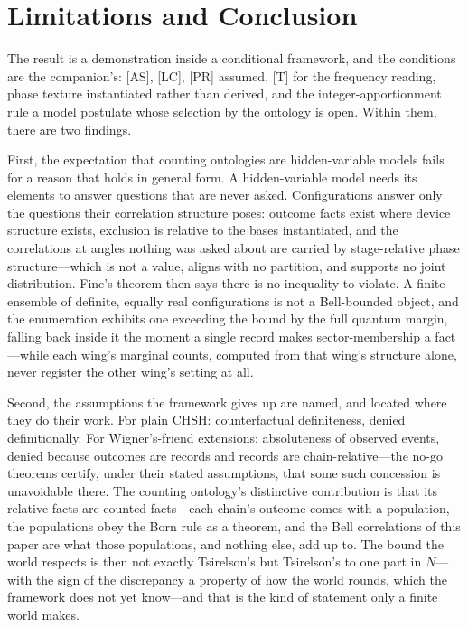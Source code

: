 \documentclass[11pt]{article}
\theoremstyle{definition}
\theoremstyle{remark}
\begin{document}
\section{Limitations and Conclusion}\label{sec:concl}
The result is a demonstration inside a conditional framework, and the conditions are the companion's: [AS], [LC], [PR] assumed, [T] for the frequency reading, phase texture instantiated rather than derived, and the integer-apportionment rule a model postulate whose selection by the ontology is open. Within them, there are two findings.

First, the expectation that counting ontologies are hidden-variable models fails for a reason that holds in general form. A hidden-variable model needs its elements to answer questions that are never asked. Configurations answer only the questions their correlation structure poses: outcome facts exist where device structure exists, exclusion is relative to the bases instantiated, and the correlations at angles nothing was asked about are carried by stage-relative phase structure---which is not a value, aligns with no partition, and supports no joint distribution. Fine's theorem then says there is no inequality to violate. A finite ensemble of definite, equally real configurations is not a Bell-bounded object, and the enumeration exhibits one exceeding the bound by the full quantum margin, falling back inside it the moment a single record makes sector-membership a fact---while each wing's marginal counts, computed from that wing's structure alone, never register the other wing's setting at all.

Second, the assumptions the framework gives up are named, and located where they do their work. For plain CHSH: counterfactual definiteness, denied definitionally. For Wigner's-friend extensions: absoluteness of observed events, denied because outcomes are records and records are chain-relative---the no-go theorems certify, under their stated assumptions, that some such concession is unavoidable there. The counting ontology's distinctive contribution is that its relative facts are counted facts---each chain's outcome comes with a population, the populations obey the Born rule as a theorem, and the Bell correlations of this paper are what those populations, and nothing else, add up to. The bound the world respects is then not exactly Tsirelson's but Tsirelson's to one part in $N$---with the sign of the discrepancy a property of how the world rounds, which the framework does not yet know---and that is the kind of statement only a finite world makes.
\end{document}
